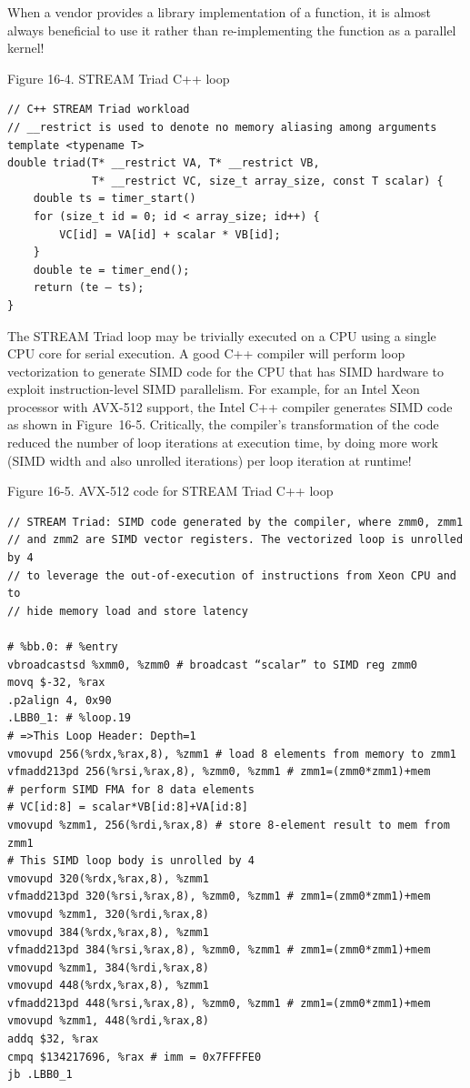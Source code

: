 \begin{tcolorbox}[colback=blue!5!white,colframe=blue!75!black, title=USE VENDOR-PROVIDED LIBRARIES!]
When a vendor provides a library implementation of a function, it is almost always beneficial to use it rather than re-implementing the function as a parallel kernel!
\end{tcolorbox}

\hspace*{\fill} \par %
Figure 16-4. STREAM Triad C++ loop
\begin{lstlisting}[caption={}]
// C++ STREAM Triad workload
// __restrict is used to denote no memory aliasing among arguments 
template <typename T>
double triad(T* __restrict VA, T* __restrict VB, 
			 T* __restrict VC, size_t array_size, const T scalar) {
	double ts = timer_start()
	for (size_t id = 0; id < array_size; id++) {
		VC[id] = VA[id] + scalar * VB[id];
	}
	double te = timer_end();
	return (te – ts); 
}
\end{lstlisting}

The STREAM Triad loop may be trivially executed on a CPU using a single CPU core for serial execution. A good C++ compiler will perform loop vectorization to generate SIMD code for the CPU that has SIMD hardware to exploit instruction-level SIMD parallelism. For example, for an Intel Xeon processor with AVX-512 support, the Intel C++ compiler generates SIMD code as shown in Figure 16-5. Critically, the compiler’s transformation of the code reduced the number of loop iterations at execution time, by doing more work (SIMD width and also unrolled iterations) per loop iteration at runtime!\par

\hspace*{\fill} \par %
Figure 16-5. AVX-512 code for STREAM Triad C++ loop
\begin{lstlisting}[caption={}]
// STREAM Triad: SIMD code generated by the compiler, where zmm0, zmm1 
// and zmm2 are SIMD vector registers. The vectorized loop is unrolled by 4
// to leverage the out-of-execution of instructions from Xeon CPU and to
// hide memory load and store latency 

# %bb.0: # %entry
vbroadcastsd %xmm0, %zmm0 # broadcast “scalar” to SIMD reg zmm0
movq $-32, %rax
.p2align 4, 0x90
.LBB0_1: # %loop.19
# =>This Loop Header: Depth=1
vmovupd 256(%rdx,%rax,8), %zmm1 # load 8 elements from memory to zmm1 
vfmadd213pd 256(%rsi,%rax,8), %zmm0, %zmm1 # zmm1=(zmm0*zmm1)+mem
# perform SIMD FMA for 8 data elements 
# VC[id:8] = scalar*VB[id:8]+VA[id:8] 
vmovupd %zmm1, 256(%rdi,%rax,8) # store 8-element result to mem from zmm1 
# This SIMD loop body is unrolled by 4
vmovupd 320(%rdx,%rax,8), %zmm1
vfmadd213pd 320(%rsi,%rax,8), %zmm0, %zmm1 # zmm1=(zmm0*zmm1)+mem
vmovupd %zmm1, 320(%rdi,%rax,8)
vmovupd 384(%rdx,%rax,8), %zmm1
vfmadd213pd 384(%rsi,%rax,8), %zmm0, %zmm1 # zmm1=(zmm0*zmm1)+mem
vmovupd %zmm1, 384(%rdi,%rax,8)
vmovupd 448(%rdx,%rax,8), %zmm1
vfmadd213pd 448(%rsi,%rax,8), %zmm0, %zmm1 # zmm1=(zmm0*zmm1)+mem
vmovupd %zmm1, 448(%rdi,%rax,8)
addq $32, %rax
cmpq $134217696, %rax # imm = 0x7FFFFE0
jb .LBB0_1
\end{lstlisting}

